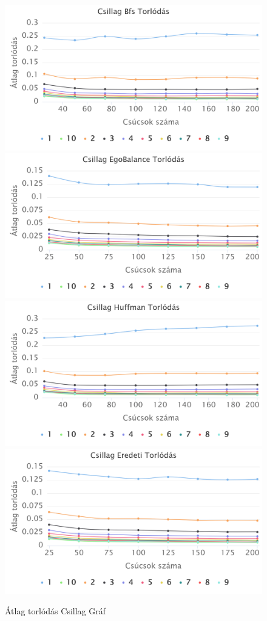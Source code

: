 \documentclass[12pt]{report}
\begin{document}
\begin{figure}[h]
	\begin{center}
		\includegraphics[width=0.49\linewidth]{pictures/star_con_bfs.png}
		\includegraphics[width=0.49\linewidth]{pictures/star_con_egobalance.png}
		\includegraphics[width=0.49\linewidth]{pictures/star_con_huffman.png}
		\includegraphics[width=0.49\linewidth]{pictures/star_con_original.png}
		\caption{Átlag torlódás Csillag Gráf}
		\label{avg-con-star}
	\end{center}
\end{figure}
\end{document}
